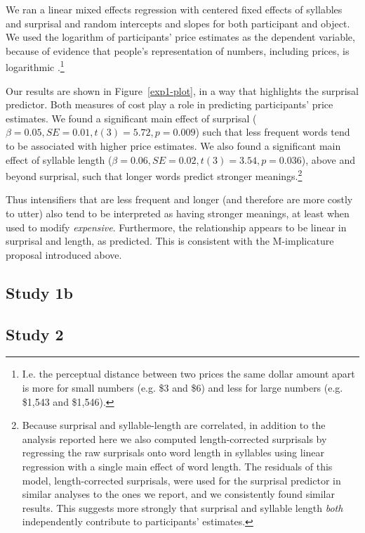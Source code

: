 \documentclass[10pt,letterpaper]{article}
\begin{document}
We ran a linear mixed effects regression with centered fixed effects of syllables and surprisal and random intercepts and slopes for both participant and object.
We used the logarithm of participants' price estimates as the dependent variable, because of evidence that people's representation of numbers, including prices, is logarithmic \cite[e.g.]{dehaene}.\footnote{
  I.e. the perceptual distance between two prices the same dollar amount apart is more for small numbers (e.g. \$3 and \$6) and less for large numbers (e.g. \$1,543 and \$1,546).
}

Our results are shown in Figure~\ref{exp1-plot}, in a way that highlights the surprisal predictor. Both measures of cost play a role in predicting participants' price estimates. We found a significant main effect of surprisal ($\beta=0.05, SE=0.01, t(3)=5.72, p=0.009$) such that less frequent words tend to be associated with higher price estimates. We also found a significant main effect of syllable length ($\beta=0.06, SE=0.02, t(3)=3.54, p=0.036$), above and beyond surprisal, such that longer words predict stronger meanings.\footnote{
Because surprisal and syllable-length are correlated, in addition to the analysis reported here we also computed length-corrected surprisals by regressing the raw surprisals onto word length in syllables using linear regression with a single main effect of word length. The residuals of this model, length-corrected surprisals, were used for the surprisal predictor in similar analyses to the ones we report, and we consistently found similar results. This suggests more strongly that surprisal and syllable length \emph{both} independently contribute to participants' estimates.
}

Thus intensifiers that are less frequent and longer (and therefore are more costly to utter) also tend to be interpreted as having stronger meanings, at least when used to modify \emph{expensive}. Furthermore, the relationship appears to be linear in surprisal and length, as predicted.
This is consistent with the M-implicature proposal introduced above.

\subsection{Study 1b \label{sec:study1b}}

\subsection{Study 2 \label{sec:study2}}
\end{document}
